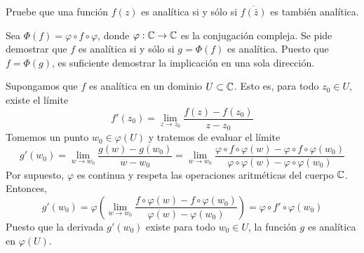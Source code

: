 \begin{exercise}
Pruebe que una función $f(z)$ es analítica si y sólo si $\overline {f(\bar z)}$ es también analítica.
\end{exercise}

\begin{solution}
Sea $\Phi(f) = \varphi \circ f \circ \varphi$, donde $\varphi : \mathbb C \to \mathbb C$ es la conjugación compleja. Se pide demostrar que $f$ es analítica si y sólo si $g = \Phi(f)$ es analítica. Puesto que $f = \Phi(g)$, es suficiente demostrar la implicación en una sola dirección.

Supongamos que $f$ es analítica en un dominio $U \subset \mathbb C$. Esto es, para todo $z_0 \in U$, existe el límite
$$f'(z_0) = \lim_{z \to z_0} \frac {f(z) - f(z_0)} {z - z_0}$$
Tomemos un punto $w_0 \in \varphi(U)$ y tratemos de evaluar el límite
$$
g'(w_0)
    = \lim_{w \to w_0} \frac {g(w) - g(w_0)} {w - w_0}
    = \lim_{w \to w_0} \frac
        {\varphi \circ f \circ \varphi(w) - \varphi \circ f \circ \varphi(w_0)}
        {\varphi \circ \varphi(w) - \varphi \circ \varphi(w_0)}
$$
Por supuesto, $\varphi$ es continua y respeta las operaciones aritméticas del cuerpo $\mathbb C$. Entonces,
$$
g'(w_0)
    = \varphi \left( \lim_{w \to w_0} \frac
        {f \circ \varphi(w) - f \circ \varphi(w_0)}
        {\varphi(w) -\varphi(w_0)} \right)
    = \varphi \circ f' \circ \varphi(w_0)
$$
Puesto que la derivada $g'(w_0)$ existe para todo $w_0 \in U$, la función $g$ es analítica en $\varphi(U)$.
\end{solution}
